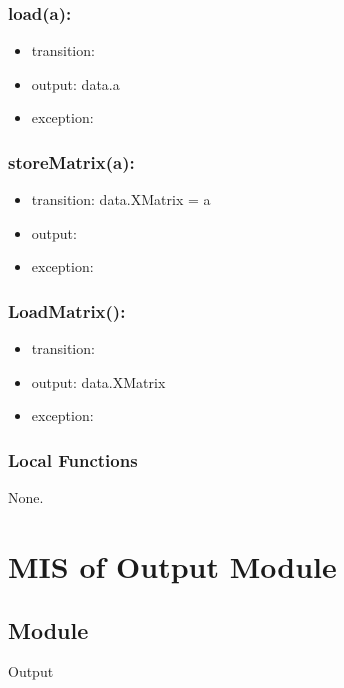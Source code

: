 \documentclass[12pt, titlepage]{article}
\begin{document}
\subsubsection*{load(a):}
\begin{itemize}
	\item transition:  
	\item output: data.a
	\item exception:  
\end{itemize}


\subsubsection*{storeMatrix(a):}
\begin{itemize}
	\item transition: data.XMatrix = a 
	\item output: 
	\item exception:  
\end{itemize}

\subsubsection*{LoadMatrix():}
\begin{itemize}
	\item transition:  
	\item output: data.XMatrix
	\item exception:  
\end{itemize}



\subsubsection{Local Functions}

None.

\newpage
%
%
%
%
\section{MIS of Output Module} \label{MPM} 



\subsection{Module}
Output
\end{document}
